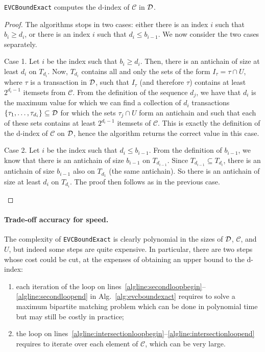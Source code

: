 \begin{lemma}\label{lem:evcboundexactcorrect}
	\texttt{EVCBoundExact} computes the d-index of $\mathcal{C}$ in ${\cal D}$.
\end{lemma}
\begin{proof}
	The algorithms stops in two cases: either there is an index $i$ such that
	$b_i\ge d_i$, or there is an index $i$ such that $d_i\le b_{i-1}$. We now
	consider the two cases separately.

	\begin{description}
		\item{Case 1.} Let $i$ be the index such that $b_i\ge d_i$. Then, there
			is an antichain of size at least $d_i$ on $T_{d_i}$. Now, $T_{d_i}$
			contains all and only the sets of the form $I_\tau=\tau\cap U$,
			where $\tau$ is a transaction in ${\cal D}$, such that $I_\tau$ (and
			therefore $\tau$) contains at least $2^{d_i-1}$ itemsets from
			$\mathcal{C}$. From the definition of the sequence $d_j$, we have
			that $d_i$ is the maximum value for which
			we can find a collection of $d_i$ transactions
			$\{\tau_1,\dotsc,\tau_{d_i}\}\subseteq{\cal D}$ for which the sets
			$\tau_j\cap U$ form an antichain and such that each of these sets
			contains at least $2^{d_i-1}$ itemsets of $\mathcal{C}$. This is
			exactly the definition of the d-index of $\mathcal{C}$ on ${\cal D}$,
			hence the algorithm returns the correct value in this case.
		\item{Case 2.} Let $i$ be the index such that $d_i\le b_{i-1}$. From the
			definition of $b_{i-1}$, we know that there is an antichain of size
			$b_{i-1}$ on $T_{d_{i-1}}$. Since $T_{d_{i-1}}\subseteq T_{d_i}$,
			there is an antichain of size $b_{i-1}$ also on $T_{d_1}$ (the same
			antichain). So there is an antichain of size at least $d_i$ on
			$T_{d_i}$. The proof then follows as in the previous case.
	\end{description}
\end{proof}

\paragraph{Trade-off accuracy for speed.} The complexity of
\texttt{EVCBoundExact} is clearly polynomial in the sizes of ${\cal D}$,
$\mathcal{C}$, and $U$, but indeed some steps are quite expensive. In
particular, there are two steps whose cost could be cut, at the expenses of
obtaining an upper bound to the d-index:
\begin{enumerate}
	\item each iteration of the loop on
		lines~\ref{algline:secondloopbegin}--\ref{algline:secondloopend} in
		Alg.~\ref{alg:evcboundexact} requires to solve a maximum bipartite
		matching problem which can be done in polynomial time but may still be
		costly in practice;
	\item the loop on
		lines~\ref{algline:intersectionloopbegin}--\ref{algline:intersectionloopend}
		requires to iterate over each element of $\mathcal{C}$, which can be
		very large.
\end{enumerate}

